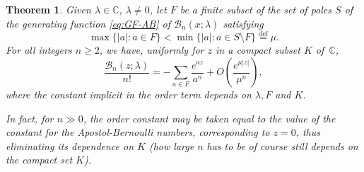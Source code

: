 \documentclass[11pt,a4paper]{amsart}
\newcommand{\C}{\mathbb{C}}
\newcommand{\B}{\mathcal{B}}
\newcommand{\eqdef}{\overset{\mathrm{def}}{=}}
\theoremstyle{plain}
\newtheorem{theorem}{Theorem}
\theoremstyle{remark}
\begin{document}
\begin{theorem}
\label{thm:approx-AB}
Given $\lambda \in \C$, $\lambda \neq 0$, let $F$ be a finite subset of the set of poles $S$ of the generating function \eqref{eq:GF-AB} of $\B_{n}(x;\lambda)$ satisfying
$$
	\max\{ |a| : a \in F \} < \min\{ |a| : a \in S \setminus F \} \eqdef \mu.
$$
For all integers $n \geq 2$, we have, uniformly for $z$ in a compact subset $K$ of~$\C$,
%
\begin{equation}
\label{eq:approx-AB}
	\frac{\B_{n}(z;\lambda)}{n!} = -\sum_{a \in F} \frac{e^{az}}{a^{n}} 
	                               + O\left(\frac{e^{\mu|z|}}{\mu^{n}}\right),
\end{equation}
%
where the constant implicit in the order term depends on $\lambda, F$ and $K$.

In fact, for $n \gg 0$, the order constant may be taken equal to the value of the constant for the Apostol-Bernoulli numbers, corresponding to $z = 0$, thus eliminating its dependence on $K$ (how large $n$ has to be of course still depends on the compact set $K$).
\end{theorem}
\end{document}
